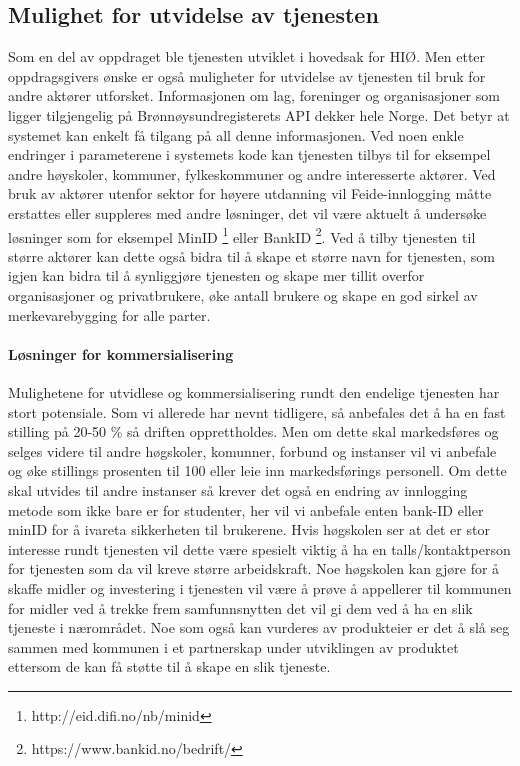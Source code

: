 \subsection{Mulighet for utvidelse av tjenesten}
Som en del av oppdraget ble tjenesten utviklet i hovedsak for HIØ. Men etter oppdragsgivers ønske er også muligheter for utvidelse av tjenesten til bruk for andre aktører utforsket. Informasjonen om lag, foreninger og organisasjoner som ligger tilgjengelig på Brønnøysundregisterets API dekker hele Norge. Det betyr at systemet kan enkelt få tilgang på all denne informasjonen. Ved noen enkle endringer i parameterene i systemets kode kan tjenesten tilbys til for eksempel andre høyskoler, kommuner, fylkeskommuner og andre interesserte aktører. Ved bruk av aktører utenfor sektor for høyere utdanning vil Feide-innlogging måtte erstattes eller suppleres med andre løsninger, det vil være aktuelt å undersøke løsninger som for eksempel MinID \footnote{http://eid.difi.no/nb/minid} eller BankID \footnote{https://www.bankid.no/bedrift/}. Ved å tilby tjenesten til større aktører kan dette også bidra til å skape et større navn for tjenesten, som igjen kan bidra til å synliggjøre tjenesten og skape mer tillit overfor organisasjoner og privatbrukere, øke antall brukere og skape en god sirkel av merkevarebygging for alle parter.

\paragraph{Løsninger for kommersialisering}

Mulighetene for utvidlese og kommersialisering rundt den endelige tjenesten har stort potensiale. Som vi allerede har nevnt tidligere, så anbefales det å ha en fast stilling på 20-50 \% så driften opprettholdes. Men om dette skal markedsføres og selges videre til andre høgskoler, komunner, forbund og instanser vil vi anbefale og øke stillings prosenten til 100 eller leie inn markedsførings personell. Om dette skal utvides til andre instanser så krever det også en endring av innlogging metode som ikke bare er for studenter, her vil vi anbefale enten bank-ID eller minID for å ivareta sikkerheten til brukerene. Hvis høgskolen ser at det er stor interesse rundt tjenesten vil dette være spesielt viktig å ha en talls/kontaktperson for tjenesten som da vil kreve større arbeidskraft. Noe høgskolen kan gjøre for å skaffe midler og investering i tjenesten vil være å prøve å appellerer til kommunen for midler ved å trekke frem samfunnsnytten det vil gi dem ved å ha en slik tjeneste i nærområdet. Noe som også kan vurderes av produkteier er det å slå seg sammen med kommunen i et partnerskap under utviklingen av produktet ettersom de kan få støtte til å skape en slik tjeneste.

